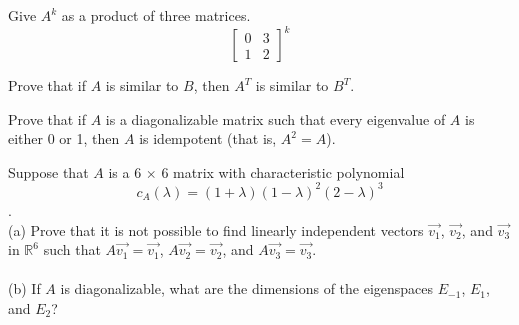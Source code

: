 \documentclass[12pt,letterpaper]{hmcpset}
\begin{document}
\begin{solution}
    \vfill
\end{solution}

\newpage

\begin{problem}[4.4.19]
    Give $A^k$ as a product of three matrices.
    \[
    \begin{bmatrix}
    0 & 3 \\ 
    1 & 2
    \end{bmatrix}^k
    \]
\end{problem}

\begin{solution}
    \vfill
\end{solution}

\newpage

\begin{problem}[4.4.42]
    Prove that if $A$ is similar to $B$, then $A^T$ is similar to $B^T$.
\end{problem}

\begin{solution}
    \vfill
\end{solution}

\newpage

\begin{problem}[4.4.49]
    Prove that if $A$ is a diagonalizable matrix such that every eigenvalue of $A$ is either 0 or 1, then $A$ is idempotent (that is, $A^2=A$).
\end{problem}

\begin{solution}
    \vfill
\end{solution}

\newpage

\begin{problem}[4.4.51]
    Suppose that $A$ is a 6 $\times$ 6 matrix with characteristic polynomial
    \[c_A(\lambda)=(1+\lambda)(1-\lambda)^2(2-\lambda)^3\].
    \\
    (a) Prove that it is not possible to find linearly independent vectors $\vec{v_1}$, $\vec{v_2}$, and $\vec{v_3}$ in $\mathbb{R}^6$ such that $A\vec{v_1}=\vec{v_1}$, $A\vec{v_2}=\vec{v_2}$, and $A\vec{v_3}=\vec{v_3}$.
    \\\\
    (b) If $A$ is diagonalizable, what are the dimensions of the eigenspaces $E_{-1}$, $E_1$, and $E_2$?
\end{problem}

\begin{solution}
    \vfill
\end{solution}

\newpage
\end{document}
